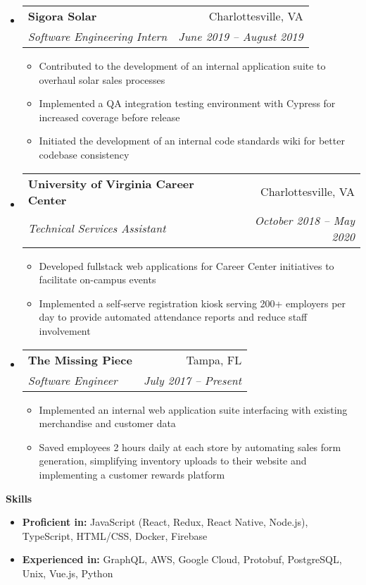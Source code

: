 \documentclass[letterpaper,12pt]{article}[leftmargin=*]
\makeatletter
\def \entryspacing {-0pt}
\renewcommand{\section}[2]{\vspace{5pt}
  \colorbox{secondary}{\color{white}\raggedbottom\normalsize\textbf{{#1}{\hspace{7pt}#2}}}
}
\newcommand{\resumeEntryStart}{\begin{itemize}[leftmargin=2.5mm]}
\newcommand{\resumeEntryEnd}{\end{itemize}\vspace{\entryspacing}}
\newcommand{\resumeItemListStart}{\begin{itemize}[leftmargin=4.5mm]}
\newcommand{\resumeItemListEnd}{\end{itemize}}
\newcommand{\resumeItem}[1]{
  \item\small{
    {#1 \vspace{-2pt}}
  }
}
\newcommand{\resumeEntryTSDL}[4]{
  \vspace{-1pt}\item[]
    \begin{tabular*}{0.97\textwidth}{l@{\extracolsep{\fill}}r}
      \textbf{\color{primary}#1} & {\firabook\color{accent}\small#2} \\
      \textit{\color{accent}\small#3} & \textit{\color{accent}\small#4} \\
    \end{tabular*}\vspace{-7pt}
}
\newcommand{\resumeEntryS}[2]{
  \item[]\small{
    \textbf{\color{primary}#1} #2\vspace{-6pt}
  }
}
\makeatother
\begin{document}
  \resumeEntryStart
    \resumeEntryTSDL
      {Sigora Solar}
      {Charlottesville, VA}
      {Software Engineering Intern}
      {June 2019 -- August 2019}
    \resumeItemListStart
      \resumeItem {Contributed to the development of an internal application suite to overhaul solar sales processes}
      \resumeItem {Implemented a QA integration testing environment with Cypress for increased coverage before release}
      \resumeItem {Initiated the development of an internal code standards wiki for better codebase consistency}
    \resumeItemListEnd
  \resumeEntryEnd

  \resumeEntryStart
    \resumeEntryTSDL
      {University of Virginia Career Center}
      {Charlottesville, VA}
      {Technical Services Assistant}
      {October 2018 -- May 2020}
    \resumeItemListStart
      \resumeItem {Developed fullstack web applications for Career Center initiatives to facilitate on-campus events}
      \resumeItem {Implemented a self-serve registration kiosk serving 200+ employers per day to provide automated attendance reports and reduce staff involvement}
    \resumeItemListEnd
  \resumeEntryEnd

  \resumeEntryStart
    \resumeEntryTSDL
      {The Missing Piece}
      {Tampa, FL}
      {Software Engineer}
      {July 2017 -- Present}
    \resumeItemListStart
      \resumeItem {Implemented an internal web application suite interfacing with existing merchandise and customer data}
      \resumeItem {Saved employees 2 hours daily at each store by automating sales form generation, simplifying inventory uploads to their website and implementing a customer rewards platform}
    \resumeItemListEnd
  \resumeEntryEnd

\section{\faGears}{Skills}
  \resumeEntryStart
  \resumeEntryS
    {Proficient in:}
    {JavaScript (React, Redux, React Native, Node.js), TypeScript, HTML/CSS, Docker, Firebase}
  \resumeEntryS
    {Experienced in:}
    {GraphQL, AWS, Google Cloud, Protobuf, PostgreSQL, Unix, Vue.js, Python}
  \resumeEntryEnd
\end{document}

